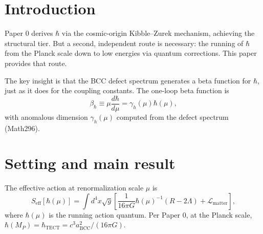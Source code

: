 \maketitle

\section{Introduction}
Paper 0 derives $\hbar$ via the cosmic-origin Kibble–Zurek mechanism,
achieving the structural tier. But a second, independent route is
necessary: the running of $\hbar$ from the Planck scale down to low
energies via quantum corrections. This paper provides that route.

The key insight is that the BCC defect spectrum generates a beta function
for $\hbar$, just as it does for the coupling constants. The one-loop
beta function is
\begin{equation}
\beta_\hbar \equiv \mu \frac{d\hbar}{d\mu} = \gamma_h(\mu) \hbar(\mu),
\end{equation}
with anomalous dimension $\gamma_h(\mu)$ computed from the defect spectrum
(Math296).

\section{Setting and main result}
The effective action at renormalization scale $\mu$ is
\begin{equation}
S_{\text{eff}}[\hbar(\mu)] = \int d^4 x \sqrt{g} \left[ \frac{1}{16\pi G}
\hbar(\mu)^{-1} (R - 2\Lambda) + \mathcal{L}_{\text{matter}} \right],
\end{equation}
where $\hbar(\mu)$ is the running action quantum. Per Paper 0, at the
Planck scale, $\hbar(M_P) = \hbar_{\text{TECT}} = c^3 a_{\text{BCC}}^2 / (16\pi G)$.

